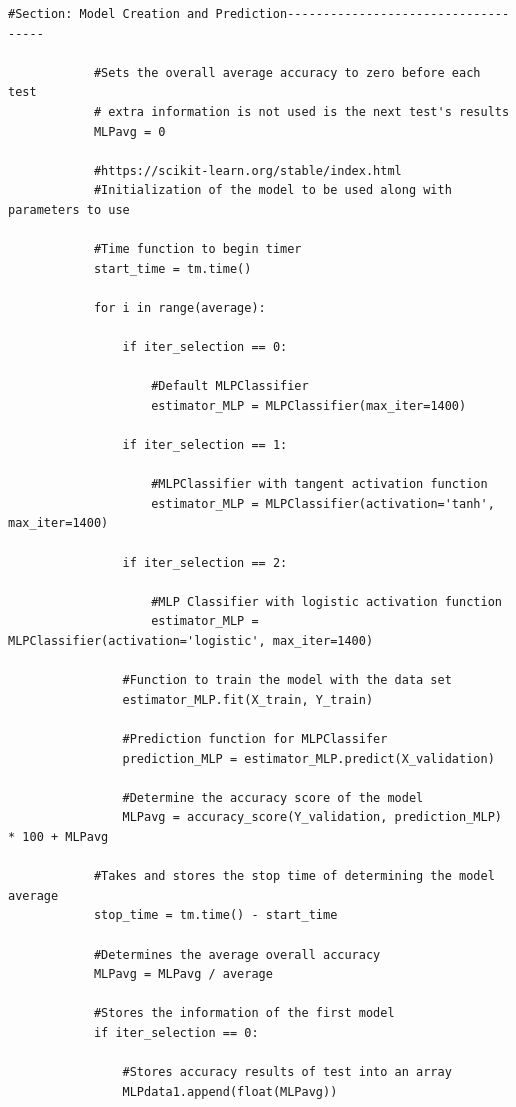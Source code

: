 \documentclass[a4paper, 12pt]{article}
\begin{document}
\begin{paragraph}
\newline
\begin{lstlisting}[frame = single]
    #Section: Model Creation and Prediction------------------------------------

            #Sets the overall average accuracy to zero before each test
            # extra information is not used is the next test's results
            MLPavg = 0

            #https://scikit-learn.org/stable/index.html
            #Initialization of the model to be used along with parameters to use

            #Time function to begin timer
            start_time = tm.time()

            for i in range(average):

                if iter_selection == 0:

                    #Default MLPClassifier
                    estimator_MLP = MLPClassifier(max_iter=1400)

                if iter_selection == 1:

                    #MLPClassifier with tangent activation function
                    estimator_MLP = MLPClassifier(activation='tanh', max_iter=1400)

                if iter_selection == 2:

                    #MLP Classifier with logistic activation function
                    estimator_MLP = MLPClassifier(activation='logistic', max_iter=1400)

                #Function to train the model with the data set
                estimator_MLP.fit(X_train, Y_train)

                #Prediction function for MLPClassifer
                prediction_MLP = estimator_MLP.predict(X_validation)
               
                #Determine the accuracy score of the model
                MLPavg = accuracy_score(Y_validation, prediction_MLP) * 100 + MLPavg

            #Takes and stores the stop time of determining the model average
            stop_time = tm.time() - start_time
            
            #Determines the average overall accuracy
            MLPavg = MLPavg / average

            #Stores the information of the first model
            if iter_selection == 0:   
                
                #Stores accuracy results of test into an array
                MLPdata1.append(float(MLPavg))


\end{lstlisting}
\end{paragraph}
\end{document}
